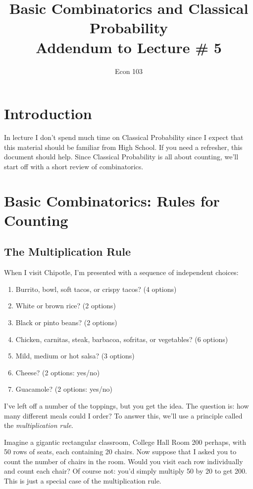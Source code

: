 \documentclass[12pt]{article}
\title{Basic Combinatorics and Classical Probability\\ \large Addendum to Lecture \# 5}
\author{Econ 103}
\date{}
\begin{document}
\maketitle

\section*{Introduction}
In lecture I don't spend much time on Classical Probability since I expect that this material should be familiar from High School.
If you need a refresher, this document should help.
Since Classical Probability is all about counting, we'll start off with a short review of combinatorics.

\section*{Basic Combinatorics: Rules for Counting}
\subsection*{The Multiplication Rule}
When I visit Chipotle, I'm presented with a sequence of independent choices:
\begin{enumerate}
  \item Burrito, bowl, soft tacos, or crispy tacos? (4 options)
  \item White or brown rice? (2 options)
  \item Black or pinto beans? (2 options)
  \item Chicken, carnitas, steak, barbacoa, sofritas, or vegetables? (6 options) 
  \item Mild, medium or hot salsa? (3 options)
  \item Cheese? (2 options: yes/no)
  \item Guacamole? (2 options: yes/no)
\end{enumerate}
I've left off a number of the toppings, but you get the idea.
The question is: how many different meals could I order?
To answer this, we'll use a principle called the \emph{multiplication rule}.

Imagine a gigantic rectangular classroom, College Hall Room 200 perhaps, with 50 rows of seats, each containing 20 chairs.
Now suppose that I asked you to count the number of chairs in the room.
Would you visit each row individually and count each chair? 
Of course not: you'd simply multiply 50 by 20 to get 200.
This is just a special case of the multiplication rule.
\end{document}
